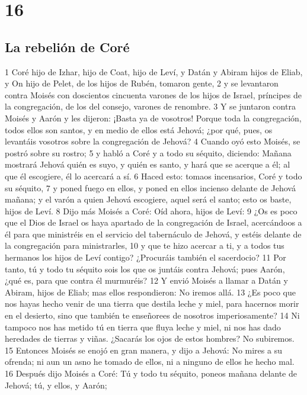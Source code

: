 \chapter{16}

\section*{La rebelión de Coré}


1 Coré hijo de Izhar, hijo de Coat, hijo de Leví, y Datán y Abiram hijos de Eliab, y On hijo de Pelet, de los hijos de Rubén, tomaron gente,
2 y se levantaron contra Moisés con doscientos cincuenta varones de los hijos de Israel, príncipes de la congregación, de los del consejo, varones de renombre.
3 Y se juntaron contra Moisés y Aarón y les dijeron: ¡Basta ya de vosotros! Porque toda la congregación, todos ellos son santos, y en medio de ellos está Jehová; ¿por qué, pues, os levantáis vosotros sobre la congregación de Jehová?
4 Cuando oyó esto Moisés, se postró sobre su rostro;
5 y habló a Coré y a todo su séquito, diciendo: Mañana mostrará Jehová quién es suyo, y quién es santo, y hará que se acerque a él; al que él escogiere, él lo acercará a sí.
6 Haced esto: tomaos incensarios, Coré y todo su séquito,
7 y poned fuego en ellos, y poned en ellos incienso delante de Jehová mañana; y el varón a quien Jehová escogiere, aquel será el santo; esto os baste, hijos de Leví.
8 Dijo más Moisés a Coré: Oíd ahora, hijos de Leví:
9 ¿Os es poco que el Dios de Israel os haya apartado de la congregación de Israel, acercándoos a él para que ministréis en el servicio del tabernáculo de Jehová, y estéis delante de la congregación para ministrarles,
10 y que te hizo acercar a ti, y a todos tus hermanos los hijos de Leví contigo? ¿Procuráis también el sacerdocio?
11 Por tanto, tú y todo tu séquito sois los que os juntáis contra Jehová; pues Aarón, ¿qué es, para que contra él murmuréis?
12 Y envió Moisés a llamar a Datán y Abiram, hijos de Eliab; mas ellos respondieron: No iremos allá.
13 ¿Es poco que nos hayas hecho venir de una tierra que destila leche y miel, para hacernos morir en el desierto, sino que también te enseñorees de nosotros imperiosamente?
14 Ni tampoco nos has metido tú en tierra que fluya leche y miel, ni nos has dado heredades de tierras y viñas. ¿Sacarás los ojos de estos hombres? No subiremos.
15 Entonces Moisés se enojó en gran manera, y dijo a Jehová: No mires a su ofrenda; ni aun un asno he tomado de ellos, ni a ninguno de ellos he hecho mal.
16 Después dijo Moisés a Coré: Tú y todo tu séquito, poneos mañana delante de Jehová; tú, y ellos, y Aarón;
